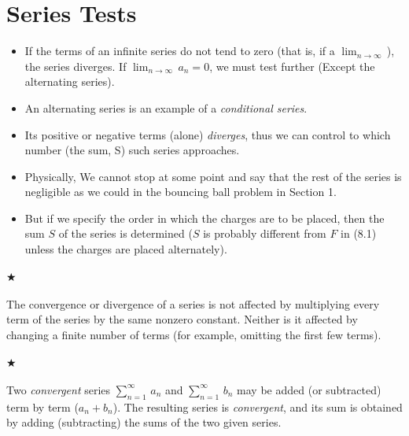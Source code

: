         \section{Series Tests}

            \begin{itemize}
                \item If the terms of an infinite series do not tend to zero
                (that is, if a $\lim_{n\to\infty}\,$), the series diverges. 
                If $\lim_{n\to\infty}\, a_n=0$, we must test further (Except the alternating series).
                \item An alternating series is an example of a \textit{conditional series}.
                \item Its positive or negative terms (alone) \textit{diverges}, thus we can control 
                to which number (the sum, S) such series approaches.
                \item Physically, We cannot stop at some point and say that the rest of the series is 
                negligible as we could in the bouncing ball problem in Section 1.
                \item But if we specify the order in which the charges are to be placed, then the sum 
                $S$ of the series is determined ($S$ is probably different from $F$ in (8.1) unless 
                the charges are placed alternately).
            \end{itemize}
                
            \paragraph{$\bigstar$} 
                The convergence or divergence of a series is not affected by multiplying 
                every term of the series by the same nonzero constant. Neither is it affected by 
                changing a finite number of terms (for example, omitting the first few terms).

            \paragraph{$\bigstar$}
                Two \textit{convergent} series $\sum_{n=1}^{\infty}\, a_n$ and $\sum_{n=1}^{\infty}\, b_n$
                may be added (or subtracted) term by term ($a_n+b_n$).
                The resulting series is \textit{convergent}, and its sum is obtained
                by adding (subtracting) the sums of the two given series.
            

